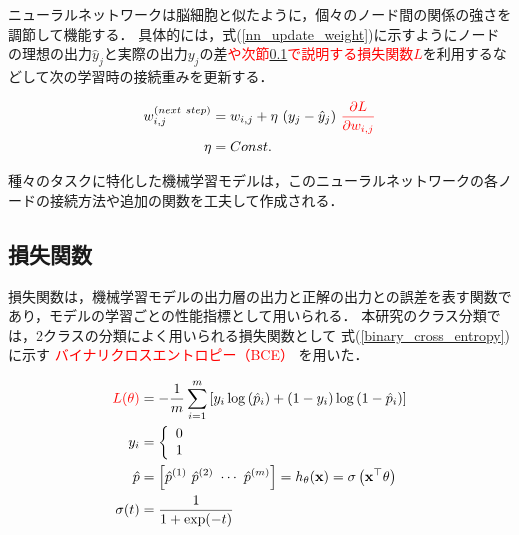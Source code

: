 \documentclass[12pt,a4j]{jreport}
\begin{document}
ニューラルネットワークは脳細胞と似たように，個々のノード間の関係の強さを調節して機能する．
具体的には，式(\ref{nn_update_weight})に示すようにノードの理想の出力$\hat{y}_j$と実際の出力$y_j$の差\textcolor{red}{や次節\ref{subsection_loss_function}で説明する損失関数$L$}を利用するなどして次の学習時の接続重みを更新する．

\begin{align}
  w_{i, j}^{(next~ step)} &= w_{i, j} + \eta~ (y_j - \hat{y}_j)~ \color{red}{\frac{\partial L}{\partial w_{i, j}}}
  \label{nn_update_weight}
  \\
  \eta &= Const.
  \label{nn_learning_rate}
\end{align}

種々のタスクに特化した機械学習モデルは，このニューラルネットワークの各ノードの接続方法や追加の関数を工夫して作成される．

\subsection{損失関数}
\label{subsection_loss_function}
損失関数は，機械学習モデルの出力層の出力と正解の出力との誤差を表す関数であり，モデルの学習ごとの性能指標として用いられる\cite{aurellen20}．
本研究のクラス分類では，2クラスの分類によく用いられる損失関数として
式(\ref{binary_cross_entropy})に示す
\textcolor{red}{バイナリクロスエントロピー（BCE）}
を用いた．



\begin{align}
  \color{red}{L}(\theta)&=-\frac{1}{m} \sum_{i=1}^{m}\left[y_{i} \log \left(\hat{p}_{i}\right)+\left(1-y_{i}\right) \log \left(1-\hat{p}_{i}\right)\right]
  \label{binary_cross_entropy}
  \\
  y_{i}&=\left\{
    \begin{array}{l}
      0 \\
      1 
    \end{array}
  \right.
  \label{logistic_predict}
  \\
  \hat{p}
  &=\left[ \hat{p}^{(1)}~ \hat{p}^{(2)}~ \cdots~ \hat{p}^{(m)} \right]
  =h_{\theta}(\mathbf{x})
  =\sigma\left(\mathbf{x}^{\top} \theta\right)
  \label{logistic_probability}
  \\
  \sigma(t)&=\frac{1}{1+\exp (-t)}
  \label{sigmoid}
\end{align}
\end{document}
